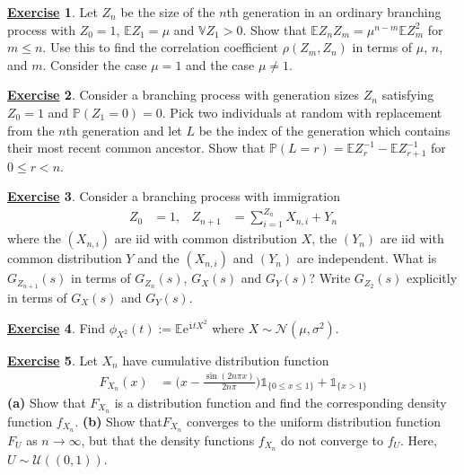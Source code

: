 \documentclass[12pt]{book}
\numberwithin{equation}{chapter}
\theoremstyle{plain}
\numberwithin{theorem}{section}
\theoremstyle{definition}
\newtheorem{exercise}{\underline{Exercise}}
\numberwithin{exercise}{chapter}
\newcommand{\<}{\langle}
\renewcommand{\>}{\rangle}
\renewcommand{\(}{\left(}
\renewcommand{\)}{\right)}
\renewcommand{\[}{\left[}
\renewcommand{\]}{\right]}
\newcommand\Eb{\mathds{E}}
\newcommand\Ib{\mathds{1}} 	%
\newcommand\Pb{\mathds{P}}
\newcommand\Vb{\mathds{V}}
\newcommand\Nc{\mathscr{N}}
\newcommand\Uc{\mathscr{U}}
\newcommand\sig{\sigma}
\newcommand\ii{\mathtt{i}}
\newcommand\ee{\mathrm{e}}
\begin{document}
\begin{exercise}
\label{exer:3.2}
Let $Z_n$ be the size of the $n$th generation in an ordinary branching process with $Z_0 = 1$, $\Eb Z_1 = \mu$ and $\Vb Z_1 > 0$.  Show that $\Eb Z_n Z_m = \mu^{n-m} \Eb Z_m^2$ for $m \leq n$.  Use this to find the correlation coefficient $\rho(Z_m,Z_n)$ in terms of $\mu$, $n$, and $m$.  Consider the case $\mu = 1$ and the case $\mu \neq 1$.
\end{exercise}

\begin{exercise}
\label{exer:3.3}
Consider a branching process with generation sizes $Z_n$ satisfying $Z_0 = 1$ and $\Pb(Z_1 = 0) = 0$.  Pick two individuals at random with replacement from the $n$th generation and let $L$ be the index of the generation which contains their most recent common ancestor.  Show that $\Pb(L=r) = \Eb Z_r^{-1} - \Eb Z_{r+1}^{-1}$ for $0 \leq r < n$.  
\end{exercise}

\begin{exercise}
\label{exer:3.4}
Consider a branching process with immigration
\begin{align}
Z_0
	&=	1 , &
Z_{n+1}
	&=	\sum_{i=1}^{Z_n} X_{n,i} + Y_n 
\end{align}
where the $(X_{n,i})$ are iid with common distribution $X$, the $(Y_n)$ are iid with common distribution $Y$ and the $(X_{n,i})$ and $(Y_n)$ are independent.  What is $G_{Z_{n+1}}(s)$ in terms of $G_{Z_n}(s)$, $G_X(s)$ and $G_Y(s)$?  Write $G_{Z_2}(s)$ explicitly in terms of $G_X(s)$ and $G_Y(s)$.
\end{exercise}

\begin{exercise}
\label{exer:3.5}
Find $\phi_{X^2}(t) := \Eb \ee^{\ii t X^2}$ where $X \sim \Nc(\mu,\sig^2)$.
\end{exercise}

\begin{exercise}
\label{exer:3.6}
Let $X_n$ have cumulative distribution function
\begin{align}
F_{X_n}(x)
	&=	\Big( x - \frac{\sin (2n\pi x)}{2 n\pi} \Big) \Ib_{\{0 \leq x \leq 1 \}} + \Ib_{\{x > 1 \}}
\end{align}
\textbf{(a)} Show that $F_{X_n}$ is a distribution function and find the corresponding density function $f_{X_n}$.
\textbf{(b)}  Show that$F_{X_n}$ converges to the uniform distribution function $F_U$ as $n \to \infty$, but that the density functions $f_{X_n}$ do not converge to $f_U$.  Here, $U \sim \Uc((0,1))$.
\end{exercise}
\end{document}
